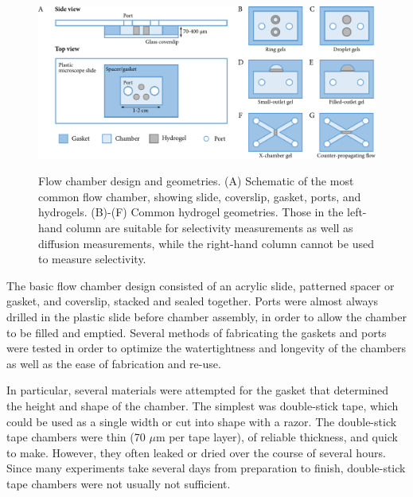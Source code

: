 \begin{figure}
\caption{Flow chamber design and geometries.  (A) Schematic of the most common flow chamber, showing slide, coverslip, gasket, ports, and hydrogels.  (B)-(F) Common hydrogel geometries.  Those in the left-hand column are suitable for selectivity measurements as well as diffusion measurements, while the right-hand column cannot be used to measure selectivity.}
\centering
\includegraphics[width=\textwidth]{figs/ch03/methods-cartoon}
\label{fig:chamber-geometries}
\end{figure}

The basic flow chamber design consisted of an acrylic slide, patterned spacer or gasket, and coverslip, stacked and sealed together.  Ports were almost always drilled in the plastic slide before chamber assembly, in order to allow the chamber to be filled and emptied.  Several methods of fabricating the gaskets and ports were tested in order to optimize the watertightness and longevity of the chambers as well as the ease of fabrication and re-use.

In particular, several materials were attempted for the gasket that determined the height and shape of the chamber.  The simplest was double-stick tape, which could be used as a single width or cut into shape with a razor.  The double-stick tape chambers were thin (70 $\mu$m per tape layer), of reliable thickness, and quick to make.  However, they often leaked or dried over the course of several hours.  Since many experiments take several days from preparation to finish, double-stick tape chambers were not usually not sufficient.

